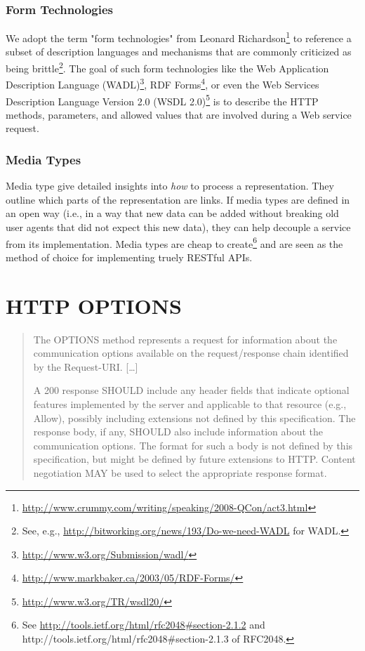 \documentclass{acm_proc_article-sp}
\begin{document}
\subsubsection{Form Technologies}\label{sec:formtechs}
We adopt the term "form technologies" from Leonard Richardson\footnote{\url{http://www.crummy.com/writing/speaking/2008-QCon/act3.html}} to reference a subset of description languages and mechanisms that are commonly criticized as being brittle\footnote{See, e.g., \url{http://bitworking.org/news/193/Do-we-need-WADL} for WADL.}. The goal of such form technologies like the Web Application Description Language (WADL)\footnote{\url{http://www.w3.org/Submission/wadl/}}, RDF Forms\footnote{\url{http://www.markbaker.ca/2003/05/RDF-Forms/}}, or even the Web Services Description Language Version 2.0 (WSDL 2.0)\footnote{\url{http://www.w3.org/TR/wsdl20/}} is to describe the HTTP methods, parameters, and allowed values that are involved during a Web service request.

\subsubsection{Media Types}\label{sec:mediatypes}
Media type give detailed insights into \textit{how} to process a representation. They outline which parts of the representation are links. If media types are defined in an open way (i.e., in a way that new data can be added without breaking old user agents that did not expect this new data), they can help decouple a service from its implementation. Media types are cheap to create\footnote{See \url{http://tools.ietf.org/html/rfc2048\#section-2.1.2} and http://tools.ietf.org/html/rfc2048\#section-2.1.3 of RFC2048.} and are seen as the method of choice for implementing truely RESTful APIs.

\section{HTTP OPTIONS}\label{sec:httpoptions}
\begin{quotation}
The OPTIONS method represents a request for information about the communication options available on the request/response chain identified by the Request-URI. [\ldots]

A 200 response SHOULD include any header fields that indicate optional features implemented by the server and applicable to that resource (e.g., Allow), possibly including extensions not defined by this specification. The response body, if any, SHOULD also include information about the communication options. The format for such a body is not defined by this specification, but might be defined by future extensions to HTTP. Content negotiation MAY be used to select the appropriate response format.
\end{quotation} \cite{HTTP:Spec}
\end{document}
